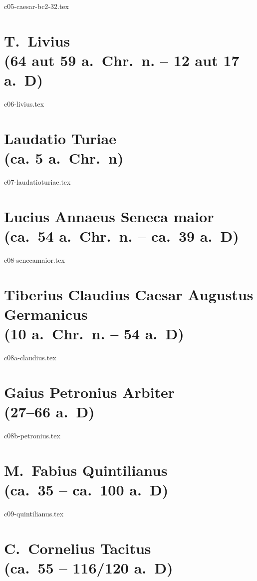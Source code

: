 \documentclass[a4paper,12pt,twoside]{report}
\begin{document}
{c05-caesar-bc2-32.tex}

\chapter[Livius]{T.\ Livius \\(64 aut 59 a.~Chr.~n. – 12 aut 17 a.~D)}

{c06-livius.tex}

\chapter[Laudatio Turiae]{Laudatio Turiae \\(ca. 5 a.\ Chr.\ n)}

{c07-laudatioturiae.tex}

\chapter[Seneca maior]{Lucius Annaeus Seneca maior \\(ca.\ 54 a.~Chr.\ n. – ca.\ 39 a.~D)}

{c08-senecamaior.tex}

\chapter[Claudius]{Tiberius Claudius Caesar Augustus Germanicus \\(10 a.~Chr.~n. – 54 a.~D)}

{c08a-claudius.tex}

\chapter[Petronius]{Gaius Petronius Arbiter \\(27–66 a.~D)}

{c08b-petronius.tex}

\chapter[Quintilianus]{M.\ Fabius Quintilianus \\(ca.\ 35 – ca.\ 100 a.~D)}

{c09-quintilianus.tex}

\chapter[Tacitus]{C.\ Cornelius Tacitus \\(ca.\ 55 – 116/120 a.~D)}
\end{document}
